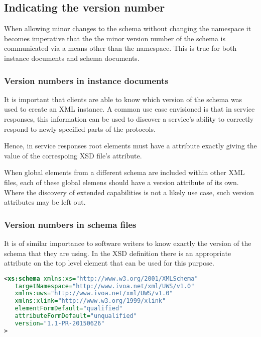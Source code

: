 \documentclass[10pt,a4paper]{ivoa}
\begin{document}
\subsection{Indicating the version number}

When allowing minor changes to the schema without changing the
namespace it becomes imperative that the the minor version number of the schema
is communicated via a means other than the namespace.  This is true for
both instance documents and schema documents.

\subsubsection{Version numbers in instance documents}

It is important that
clients are able to know which version of the schema was used to create an XML
instance.  A common use case envisioned is that in service responses,
this information can be used to discover a service's ability to
correctly respond to newly specified parts of the protocols. 

Hence, in service responses root elements must have
a 
attribute exactly giving the value of the correspoing XSD file's
 attribute.

When global elements from a different schema are included within other
XML files, each of these global elemens should have a version attribute
of its own.  Where the discovery of extended capabilities is not a
likely use case, such version attributes may be left out.

\subsubsection{Version numbers in schema files}
It is of similar importance to software writers to know exactly the version of
the schema that they are using. In the XSD definition there is an appropriate
 attribute on the top level  element that can be
used for this purpose.

\begin{lstlisting}[language=XML]
<xs:schema xmlns:xs="http://www.w3.org/2001/XMLSchema"
   targetNamespace="http://www.ivoa.net/xml/UWS/v1.0"
   xmlns:uws="http://www.ivoa.net/xml/UWS/v1.0"
   xmlns:xlink="http://www.w3.org/1999/xlink" 
   elementFormDefault="qualified"
   attributeFormDefault="unqualified"
   version="1.1-PR-20150626"
>
\end{lstlisting}
\end{document}
